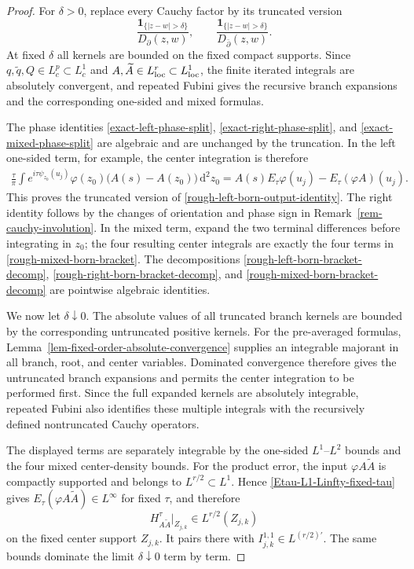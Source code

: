 \documentclass[a4paper,11pt]{article}
\newcommand{\dd}{\,\text{d}}
\theoremstyle{plain}
\theoremstyle{definition}
\theoremstyle{remark}
\begin{document}
\begin{proof}
For $\delta>0$, replace every Cauchy factor by its truncated version
\begin{equation}
 \frac{\mathbf 1_{\{|z-w|>\delta\}}}{D_\partial(z,w)},
 \qquad
 \frac{\mathbf 1_{\{|z-w|>\delta\}}}{D_{\bar\partial}(z,w)}.
\label{rough-cauchy-truncation}
\end{equation}
At fixed $\delta$ all kernels are bounded on the fixed compact supports.  Since
$q,\widetilde q,Q\in L^p_c\subset L^1_c$ and
$A,\widetilde A\in L^r_{\rm loc}\subset L^1_{\rm loc}$, the finite iterated
integrals are absolutely convergent, and repeated Fubini gives the recursive
branch expansions and the corresponding one-sided and mixed formulas.

The phase identities \eqref{exact-left-phase-split},
\eqref{exact-right-phase-split}, and
\eqref{exact-mixed-phase-split} are algebraic and are unchanged by the
truncation.  In the left one-sided term, for example, the center integration is
therefore
\begin{align*}
\frac{\tau}{\pi}\int
 e^{i\tau\psi_{z_0}(u_j)}\varphi(z_0)
 \bigl(A(s)-A(z_0)\bigr)\dd^2z_0
 =A(s)E_\tau\varphi(u_j)-E_\tau(\varphi A)(u_j).
\end{align*}
This proves the truncated version of
\eqref{rough-left-born-output-identity}.  The right identity follows by the changes of orientation and phase sign in Remark~\ref{rem-cauchy-involution}.  In
the mixed term, expand the two terminal differences before integrating in
$z_0$; the four resulting center integrals are exactly the four terms in
\eqref{rough-mixed-born-bracket}.  The decompositions
\eqref{rough-left-born-bracket-decomp},
\eqref{rough-right-born-bracket-decomp}, and
\eqref{rough-mixed-born-bracket-decomp} are pointwise algebraic identities.

We now let $\delta\downarrow0$.  The absolute values of all truncated branch
kernels are bounded by the corresponding untruncated positive kernels.  For the
pre-averaged formulas, Lemma~\ref{lem-fixed-order-absolute-convergence} supplies
an integrable majorant in all branch, root, and center variables.  Dominated
convergence therefore gives the untruncated branch expansions and permits the
center integration to be performed first.  Since the full expanded kernels are
absolutely integrable, repeated Fubini also identifies these multiple integrals
with the recursively defined nontruncated Cauchy operators.

The displayed terms are separately integrable by the one-sided $L^1$--$L^2$
bounds and the four mixed center-density bounds.  For the product error, the input
$\varphi A\widetilde A$ is compactly supported and belongs to $L^{r/2}\subset L^1$.  Hence \eqref{Etau-L1-Linfty-fixed-tau} gives
$E_\tau(\varphi A\widetilde A)\in L^\infty$ for fixed $\tau$, and therefore
\begin{equation}
 H_{A\widetilde A}^\tau\big|_{Z_{j,k}}
 \in L^{r/2}(Z_{j,k})
\end{equation}
on the fixed center support $Z_{j,k}$.  It pairs there with
$I_{j,k}^{1,1}\in L^{(r/2)'}$.  The same bounds dominate the limit
$\delta\downarrow0$ term by term.
\end{proof}
\end{document}
